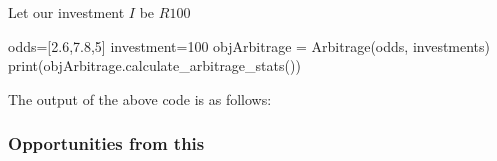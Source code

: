 Let our investment $I$ be $R100$

\begin{python}
odds=[2.6,7.8,5]
investment=100
objArbitrage = Arbitrage(odds, investments)
print(objArbitrage.calculate_arbitrage_stats())
\end{python}

The output of the above code is as follows: \\


\subsubsection{Opportunities from this}

